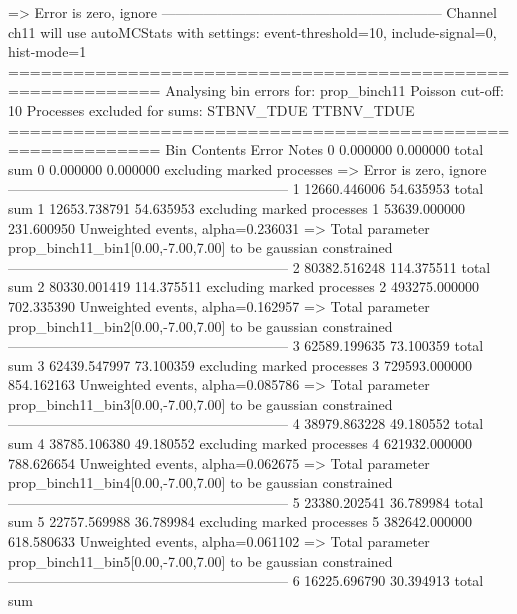   => Error is zero, ignore      
------------------------------------------------------------
Channel ch11 will use autoMCStats with settings: event-threshold=10, include-signal=0, hist-mode=1
============================================================
Analysing bin errors for: prop_binch11
Poisson cut-off: 10
Processes excluded for sums: STBNV_TDUE TTBNV_TDUE
============================================================
Bin        Contents        Error           Notes                         
0          0.000000        0.000000        total sum                     
0          0.000000        0.000000        excluding marked processes    
  => Error is zero, ignore      
------------------------------------------------------------
1          12660.446006    54.635953       total sum                     
1          12653.738791    54.635953       excluding marked processes    
1          53639.000000    231.600950      Unweighted events, alpha=0.236031
  => Total parameter prop_binch11_bin1[0.00,-7.00,7.00] to be gaussian constrained
------------------------------------------------------------
2          80382.516248    114.375511      total sum                     
2          80330.001419    114.375511      excluding marked processes    
2          493275.000000   702.335390      Unweighted events, alpha=0.162957
  => Total parameter prop_binch11_bin2[0.00,-7.00,7.00] to be gaussian constrained
------------------------------------------------------------
3          62589.199635    73.100359       total sum                     
3          62439.547997    73.100359       excluding marked processes    
3          729593.000000   854.162163      Unweighted events, alpha=0.085786
  => Total parameter prop_binch11_bin3[0.00,-7.00,7.00] to be gaussian constrained
------------------------------------------------------------
4          38979.863228    49.180552       total sum                     
4          38785.106380    49.180552       excluding marked processes    
4          621932.000000   788.626654      Unweighted events, alpha=0.062675
  => Total parameter prop_binch11_bin4[0.00,-7.00,7.00] to be gaussian constrained
------------------------------------------------------------
5          23380.202541    36.789984       total sum                     
5          22757.569988    36.789984       excluding marked processes    
5          382642.000000   618.580633      Unweighted events, alpha=0.061102
  => Total parameter prop_binch11_bin5[0.00,-7.00,7.00] to be gaussian constrained
------------------------------------------------------------
6          16225.696790    30.394913       total sum                     
